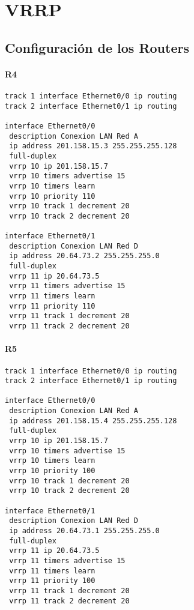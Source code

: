 \section{VRRP}
\subsection{Configuración de los Routers}
\paragraph{R4}
{\small
\begin{verbatim}
track 1 interface Ethernet0/0 ip routing
track 2 interface Ethernet0/1 ip routing

interface Ethernet0/0
 description Conexion LAN Red A
 ip address 201.158.15.3 255.255.255.128
 full-duplex
 vrrp 10 ip 201.158.15.7
 vrrp 10 timers advertise 15
 vrrp 10 timers learn
 vrrp 10 priority 110
 vrrp 10 track 1 decrement 20
 vrrp 10 track 2 decrement 20

interface Ethernet0/1
 description Conexion LAN Red D
 ip address 20.64.73.2 255.255.255.0
 full-duplex
 vrrp 11 ip 20.64.73.5
 vrrp 11 timers advertise 15
 vrrp 11 timers learn
 vrrp 11 priority 110
 vrrp 11 track 1 decrement 20
 vrrp 11 track 2 decrement 20
\end{verbatim}
}

\paragraph{R5}
{\small
\begin{verbatim}
track 1 interface Ethernet0/0 ip routing
track 2 interface Ethernet0/1 ip routing

interface Ethernet0/0
 description Conexion LAN Red A
 ip address 201.158.15.4 255.255.255.128
 full-duplex
 vrrp 10 ip 201.158.15.7
 vrrp 10 timers advertise 15
 vrrp 10 timers learn
 vrrp 10 priority 100
 vrrp 10 track 1 decrement 20
 vrrp 10 track 2 decrement 20

interface Ethernet0/1
 description Conexion LAN Red D
 ip address 20.64.73.1 255.255.255.0
 full-duplex
 vrrp 11 ip 20.64.73.5
 vrrp 11 timers advertise 15
 vrrp 11 timers learn
 vrrp 11 priority 100
 vrrp 11 track 1 decrement 20
 vrrp 11 track 2 decrement 20
\end{verbatim}
}
